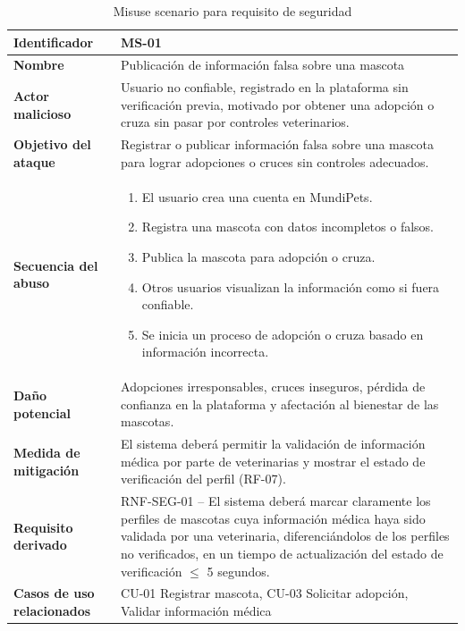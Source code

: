 \documentclass[journal,onecolumn]{IEEEtran}
\begin{document}
\begin{table}[H]
\caption{Misuse scenario para requisito de seguridad}
\label{tab:misuse}
\begin{tabularx}{\textwidth}{|l|X|}
\hline
\textbf{Identificador}      & MS-01 \\
\hline
\textbf{Nombre}             & Publicación de información falsa sobre una mascota \\
\hline
\textbf{Actor malicioso}    & Usuario no confiable, registrado en la plataforma sin verificación previa, motivado por obtener una adopción o cruza sin pasar por controles veterinarios. \\
\hline
\textbf{Objetivo del ataque} & Registrar o publicar información falsa sobre una mascota para lograr adopciones o cruces sin controles adecuados. \\
\hline
\textbf{Secuencia del abuso} & \begin{enumerate}[leftmargin=*,topsep=0pt]
                                 \item El usuario crea una cuenta en MundiPets.
                                 \item Registra una mascota con datos incompletos o falsos.
                                 \item Publica la mascota para adopción o cruza.
                                 \item Otros usuarios visualizan la información como si fuera confiable.
                                 \item Se inicia un proceso de adopción o cruza basado en información incorrecta.
                               \end{enumerate} \\
\hline
\textbf{Daño potencial}      & Adopciones irresponsables, cruces inseguros, pérdida de confianza en la plataforma y afectación al bienestar de las mascotas. \\
\hline
\textbf{Medida de mitigación} & El sistema deberá permitir la validación de información médica por parte de veterinarias y mostrar el estado de verificación del perfil (RF-07). \\
\hline
\textbf{Requisito derivado}  & RNF-SEG-01 -- El sistema deberá marcar claramente los perfiles de mascotas cuya información médica haya sido validada por una veterinaria, diferenciándolos de los perfiles no verificados, en un tiempo de actualización del estado de verificación $\leq$ 5 segundos. \\
\hline
\textbf{Casos de uso relacionados} & CU-01 Registrar mascota, CU-03 Solicitar adopción, Validar información médica \\
\hline
\end{tabularx}
\end{table}
\end{document}
